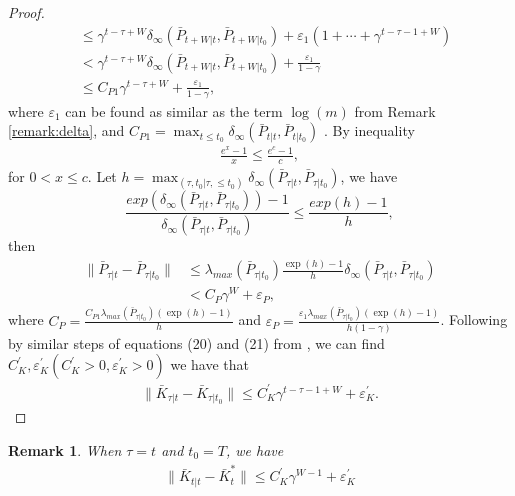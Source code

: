 \documentclass{article}
\newtheorem{remark}{Remark}
\begin{document}
\begin{proof}
\begin{align*}
        &\leq \gamma^{t-\tau+W}\delta_{\infty}(\bar{P}_{t+W|t},\bar{P}_{t+W|t_{0}}) + \varepsilon_{1}(1+\cdots+\gamma^{t-\tau-1+W})\\
        &< \gamma^{t-\tau+W}\delta_{\infty}(\bar{P}_{t+W|t},\bar{P}_{t+W|t_{0}}) + \frac{\varepsilon_{1}}{1-\gamma}\\
        &\leq C_{P1}\gamma^{t-\tau+W}+\frac{\varepsilon_{1}}{1-\gamma},
    \end{align*}
    where $\varepsilon_{1}$ can be found as similar as the term $\log(m)$ from Remark \ref{remark:delta}, and $C_{P1} = \max_{t\leq t_{0}} \delta_{\infty}(\bar{P}_{t|t},\bar{P}_{t|t_{0}})$ . By inequality
    \begin{align*}
        \frac{e^{x}-1}{x} \leq \frac{e^{c}-1}{c},
    \end{align*}
    for $0 < x \leq c$. Let $h = \max_{(\tau,t_{0}| \tau,\leq t_{0})} \delta_{\infty}(\bar{P}_{\tau|t},\bar{P}_{\tau|t_{0}})$, we have
    \begin{equation}
        \frac{exp(\delta_{\infty}(\bar{P}_{\tau|t},\bar{P}_{\tau|t_{0}}))-1}{\delta_{\infty}(\bar{P}_{\tau|t},\bar{P}_{\tau|t_{0}})} \leq \frac{exp(h)-1}{h},
    \end{equation}
    then
    \begin{align*}
        \|\bar{P}_{\tau|t}-\bar{P}_{\tau|t_{0}}\| &\leq \lambda_{max}(\bar{P}_{\tau|t_{0}})\frac{\exp(h)-1}{h}\delta_{\infty}(\bar{P}_{\tau|t},\bar{P}_{\tau|t_{0}})\\
        &< C_{P}\gamma^{W}+\varepsilon_{P},
    \end{align*}
    where $C_{P} = \frac{C_{P1}\lambda_{max}(\bar{P}_{\tau|t_{0}})(\exp(h)-1)}{h}$ and $\varepsilon_{P} = \frac{\varepsilon_{1}\lambda_{max}(\bar{P}_{\tau|t_{0}})(\exp(h)-1)}{h(1-\gamma)}$. Following by similar steps of equations (20) and (21) from \cite[Lemma 8]{chen_regret_2022}, we can find $C_{K}^{'},\varepsilon_{K}^{'}(C_{K}^{'}>0,\varepsilon_{K}^{'}>0)$ we have that
    \begin{align*}
        \|\bar{K}_{\tau|t}-\bar{K}_{\tau|t_{0}}\| \leq C_{K}^{'}\gamma^{t-\tau-1+W}+\varepsilon_{K}^{'}.
    \end{align*}
\end{proof}

\begin{remark}
    When $\tau = t$ and $t_{0} = T$, we have
    \begin{align*}
        \|\bar{K}_{t|t}-\bar{K}_{t}^{*}\| \leq C_{K}^{'}\gamma^{W-1} + \varepsilon_{K}^{'}
    \end{align*}
\end{remark}
\end{document}
